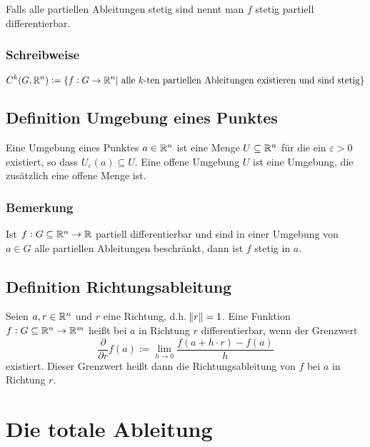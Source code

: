 Falls alle partiellen Ableitungen stetig sind nennt man $f$ stetig partiell
differentierbar.

\subsubsection{Schreibweise}
\begin{equation*}
    C^k(G, \mathbb{R}^n) := \{ f: G \rightarrow \mathbb{R}^n \vert \text{ alle } k \text{-ten
    partiellen Ableitungen existieren und sind stetig} \}
\end{equation*}

\subsection{Definition Umgebung eines Punktes}
Eine Umgebung eines Punktes $a \in \mathbb{R}^n$ ist eine Menge $U \subseteq \mathbb{R}^n$ für
die ein $\varepsilon > 0$ existiert, so dass $U_\varepsilon (a) \subseteq U$.
Eine offene Umgebung $U$ ist eine Umgebung, die zusätzlich eine offene Menge ist.

\subsubsection{Bemerkung}
Ist $f: G \subseteq \mathbb{R}^n \rightarrow \mathbb{R}$ partiell differentierbar und sind in einer
Umgebung von $a \in G$ alle partiellen Ableitungen beschränkt, dann ist $f$ stetig
in $a$.

\subsection{Definition Richtungsableitung}
Seien $a, r \in \mathbb{R}^n$ und $r$ eine Richtung, d.h. $\norm{r} = 1$. Eine Funktion
$f: G \subseteq \mathbb{R}^n \rightarrow \mathbb{R}^m$ heißt bei $a$ in Richtung $r$ differentierbar,
wenn der Grenzwert
\begin{equation*}
    \frac{\partial}{\partial r} f(a) := \lim_{h \rightarrow 0}
    \frac{f(a + h \cdot r) - f(a)}{h}
\end{equation*}
existiert. Dieser Grenzwert heißt dann die Richtungsableitung von $f$ bei $a$ in
Richtung $r$.

\section{Die totale Ableitung}

